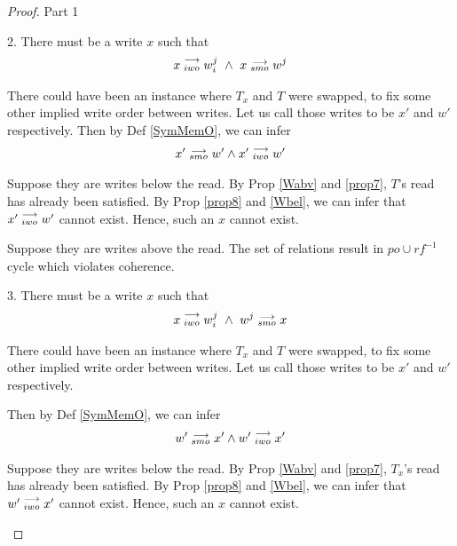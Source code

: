 \begin{proof}{Part 1}
\begin{itemize}
                        2. There must be a write $x$ such that 
                        \begin{align*}
                            \reln{x}{iwo}{w_i^j} \ \wedge \ \reln{x}{smo}{w^j}
                        \end{align*}

                        There could have been an instance where $T_x$ and $T$ were swapped, to fix some other implied write order between writes. 
                        Let us call those writes to be $x'$ and $w'$ respectively.
                        Then by Def \ref{SymMemO}, we can infer 
                        \begin{align*}
                            x'\stackrel{\longrightarrow}{_{smo}}w' \wedge x'\stackrel{\longrightarrow}{_{iwo}}w'
                        \end{align*}
                        
                        Suppose they are writes below the read.                         
                        By Prop \ref{Wabv} and \ref{prop7}, $T$'s read has already been satisfied. By Prop \ref{prop8} and \ref{Wbel}, we can infer that $x'\stackrel{\longrightarrow}{_{iwo}}w'$ cannot exist. Hence, such an $x$ cannot exist. 
                        
                        Suppose they are writes above the read.
                        The set of relations result in $po \cup rf^{-1}$ cycle which violates coherence.  

                        3. There must be a write $x$ such that 
                        \begin{align*}
                            \reln{x}{iwo}{w_i^j} \ \wedge \ \reln{w^j}{smo}{x}
                        \end{align*}

                        There could have been an instance where $T_x$ and $T$ were swapped, to fix some other implied write order between writes. 
                        Let us call those writes to be $x'$ and $w'$ respectively.
                        
                        Then by Def \ref{SymMemO}, we can infer 
                        \begin{align*}
                            w'\stackrel{\longrightarrow}{_{smo}}x' \wedge w'\stackrel{\longrightarrow}{_{iwo}}x'
                        \end{align*}

                        Suppose they are writes below the read. 
                        By Prop \ref{Wabv} and \ref{prop7}, $T_x$'s read has already been satisfied. By Prop \ref{prop8} and \ref{Wbel}, we can infer that $w'\stackrel{\longrightarrow}{_{iwo}}x'$ cannot exist. Hence, such an $x$ cannot exist. 
                        

\end{itemize}
\end{proof}
